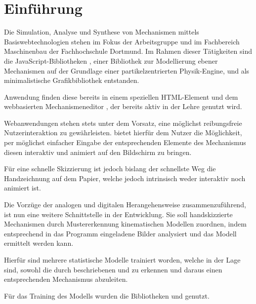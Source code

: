 \section{Einführung}
Die Simulation, Analyse und Synthese von Mechanismen mittels Basiswebtechnologien stehen im Fokus der Arbeitsgruppe  und  im Fachbereich Maschinenbau der Fachhochschule Dortmund.
Im Rahmen dieser Tätigkeiten sind die JavaScript-Bibliotheken \cite{Goessner2019}\cite{Goessner2019a}\cite{Goessner2018}, einer Bibliothek zur Modellierung ebener Mechanismen auf der Grundlage einer partikelzentrierten Physik-Engine, und \cite{Goessner2019b} als minimalistische Grafikbibliothek entstanden. 

Anwendung finden diese bereits in einem speziellen  HTML-Element und dem webbasierten Mechanismeneditor \cite{Uhlig2019}\cite{Uhlig2019a}, der bereits aktiv in der Lehre genutzt wird.

Webanwendungen stehen stets unter dem Vorsatz, eine möglichst reibungsfreie Nutzerinteraktion zu gewährleisten.
 bietet hierfür dem Nutzer die Möglichkeit, per möglichst einfacher Eingabe der entsprechenden Elemente des Mechanismus diesen interaktiv und animiert auf den Bildschirm zu bringen.

Für eine schnelle Skizzierung ist jedoch bislang der schnellste Weg die Handzeichnung auf dem Papier, welche jedoch intrinsisch weder interaktiv noch animiert ist.

Die Vorzüge der analogen und digitalen Herangehensweise zusammenzuführend, ist nun eine weitere Schnittstelle in der Entwicklung.
Sie soll handskizzierte Mechanismen durch Mustererkennung kinematischen Modellen zuordnen, indem entsprechend in das Programm eingeladene Bilder analysiert und das  Modell ermittelt werden kann.

Hierfür sind mehrere statistische Modelle trainiert worden, welche in der Lage sind, sowohl die durch  beschriebenen  und  zu erkennen und daraus einen entsprechenden Mechanismus abzuleiten.

Für das Training des Modells wurden die Bibliotheken \cite{Google2019} und \cite{Chollet2019}\cite{Chollet2017} genutzt.
